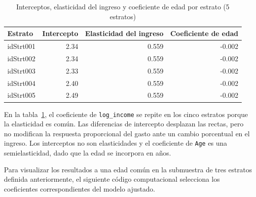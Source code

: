 \documentclass[
  spanish,
  11pt,
  letterpaper,
  oneside,
  open=any]{scrbook}
\newenvironment{Shaded}{\begin{snugshade}}{\end{snugshade}}
\newcommand{\AttributeTok}[1]{\textcolor[rgb]{0.40,0.45,0.13}{#1}}
\newcommand{\FunctionTok}[1]{\textcolor[rgb]{0.28,0.35,0.67}{#1}}
\newcommand{\NormalTok}[1]{\textcolor[rgb]{0.00,0.23,0.31}{#1}}
\newcommand{\OtherTok}[1]{\textcolor[rgb]{0.00,0.23,0.31}{#1}}
\newcommand{\SpecialCharTok}[1]{\textcolor[rgb]{0.37,0.37,0.37}{#1}}
\newcommand{\StringTok}[1]{\textcolor[rgb]{0.13,0.47,0.30}{#1}}
\begin{document}
{

\begin{longtable}[]{@{}lrrr@{}}

\caption{\label{tbl-coef-intercepto-aleatorio}Interceptos, elasticidad
del ingreso y coeficiente de edad por estrato (5 estratos)}

\tabularnewline

\toprule\noalign{}
Estrato & Intercepto & Elasticidad del ingreso & Coeficiente de edad \\
\midrule\noalign{}
\endhead
\bottomrule\noalign{}
\endlastfoot
idStrt001 & 2.34 & 0.559 & -0.002 \\
idStrt002 & 2.34 & 0.559 & -0.002 \\
idStrt003 & 2.33 & 0.559 & -0.002 \\
idStrt004 & 2.40 & 0.559 & -0.002 \\
idStrt005 & 2.49 & 0.559 & -0.002 \\

\end{longtable}

}

En la tabla~\ref{tbl-coef-intercepto-aleatorio}, el coeficiente de
\texttt{log\_income} se repite en los cinco estratos porque la
elasticidad es común. Las diferencias de intercepto desplazan las
rectas, pero no modifican la respuesta proporcional del gasto ante un
cambio porcentual en el ingreso. Los interceptos no son elasticidades y
el coeficiente de \texttt{Age} es una semielasticidad, dado que la edad
se incorpora en años.

Para visualizar los resultados a una edad común en la submuestra de tres
estratos definida anteriormente, el siguiente código computacional
selecciona los coeficientes correspondientes del modelo ajustado.

\begin{Shaded}
\end{Shaded}
\end{document}
